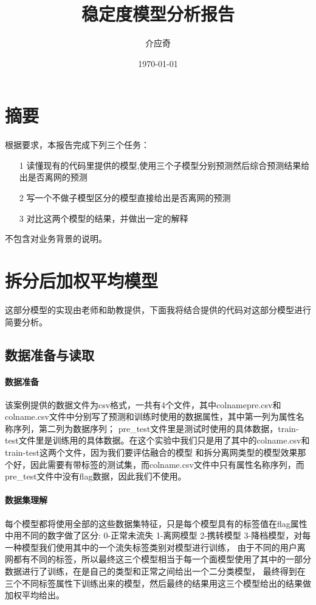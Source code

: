 \documentclass{article}
\begin{document}
\title{稳定度模型分析报告}
\author{介应奇}
\date{\today}
\maketitle
\tableofcontents

\section{摘要}
根据要求，本报告完成下列三个任务：
\begin{itemize}
  \item [1] 
	读懂现有的代码里提供的模型,使用三个子模型分别预测然后综合预测结果给出是否离网的预测
  \item [2]
	写一个不做子模型区分的模型直接给出是否离网的预测
  \item [3]
	对比这两个模型的结果，并做出一定的解释
\end{itemize}

不包含对业务背景的说明。

\section{拆分后加权平均模型}
这部分模型的实现由老师和助教提供，下面我将结合提供的代码对这部分模型进行简要分析。

\subsection{数据准备与读取}

\paragraph{数据准备}

该案例提供的数据文件为csv格式，一共有4个文件，其中colname\-pre.csv和colname.csv文件中分别写了预测和训练时使用的数据属性，其中第一列为属性名称序列，第二列为数据序列； 
pre\_test文件里是测试时使用的具体数据，train-test文件里是训练用的具体数据。在这个实验中我们只是用了其中的colname.csv和train-test这两个文件，因为我们要评估融合的模型
和拆分离网类型的模型效果那个好，因此需要有带标签的测试集，而colname.csv文件中只有属性名称序列，而pre\_test文件中没有flag数据，因此我们不使用。

\paragraph{数据集理解}
每个模型都将使用全部的这些数据集特征，只是每个模型具有的标签值在flag属性中用不同的数字做了区分:
0-正常未流失  1-离网模型  2-携转模型  3-降档模型，对每一种模型我们使用其中的一个流失标签类别对模型进行训练，
由于不同的用户离网都有不同的标签，所以最终这三个模型相当于每一个面模型使用了其中的一部分数据进行了训练，在是自己的类型和正常之间给出一个二分类模型，
最终得到在三个不同标签属性下训练出来的模型，然后最终的结果用这三个模型给出的结果做加权平均给出。
\end{document}

